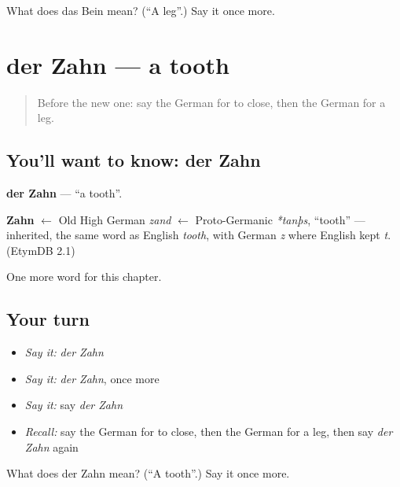 \begin{tcolorbox}[breakable,colback=teal!4,colframe=teal!35!black,title={Before you move on}]
What does das Bein mean? (\textquotedblleft{}A leg\textquotedblright{}.) Say it once more.
\end{tcolorbox}
\section[der Zahn]{der Zahn — a tooth}

\label{lesson:GE-C56-zahn}



\begin{quote}
Before the new one: say the German for to close, then the German for a leg.
\end{quote}

\subsection*{You'll want to know: der Zahn}
\textbf{der Zahn} — \textquotedblleft{}a tooth\textquotedblright{}.

\begin{cousinweb}
\textbf{Zahn} $\leftarrow$ Old High German \emph{zand} $\leftarrow$ Proto-Germanic \emph{*tanþs}, \textquotedblleft{}tooth\textquotedblright{} — inherited, the same word as English \emph{tooth}, with German \emph{z} where English kept \emph{t}. (EtymDB 2.1)
\end{cousinweb}

\begin{grammarlens}[title={What you've built}]
One more word for this chapter.
\end{grammarlens}

\subsection*{Your turn}
\begin{itemize}
\raggedright
  \item \emph{Say it:} \emph{der Zahn}
  \item \emph{Say it:} \emph{der Zahn}, once more
  \item \emph{Say it:} say \emph{der Zahn}
  \item \emph{Recall:} say the German for to close, then the German for a leg, then say \emph{der Zahn} again
\end{itemize}

\begin{tcolorbox}[breakable,colback=teal!4,colframe=teal!35!black,title={Before you move on}]
What does der Zahn mean? (\textquotedblleft{}A tooth\textquotedblright{}.) Say it once more.
\end{tcolorbox}

